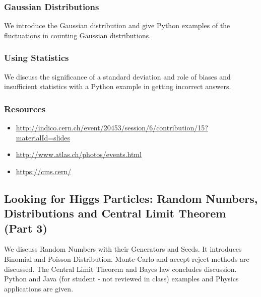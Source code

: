 
\subsubsection{Gaussian Distributions}\label{gaussian-distributions}

We introduce the Gaussian distribution and give Python examples of the
fluctuations in counting Gaussian distributions.


\subsubsection{Using Statistics}\label{using-statistics}

We discuss the significance of a standard deviation and role of biases
and insufficient statistics with a Python example in getting incorrect
answers.


\subsubsection{Resources}\label{resources-2}

\begin{itemize}

\item
  \url{http://indico.cern.ch/event/20453/session/6/contribution/15?materialId=slides}
\item
  \url{http://www.atlas.ch/photos/events.html}
\item
  \url{https://cms.cern/}
\end{itemize}

\subsection{Looking for Higgs Particles: Random Numbers, Distributions
and Central Limit Theorem (Part
3)}\label{looking-for-higgs-particles-random-numbers-distributions-and-central-limit-theorem-part-3}

We discuss Random Numbers with their Generators and Seeds. It introduces
Binomial and Poisson Distribution. Monte-Carlo and accept-reject methods
are discussed. The Central Limit Theorem and Bayes law concludes
discussion. Python and Java (for student - not reviewed in class)
examples and Physics applications are given.

